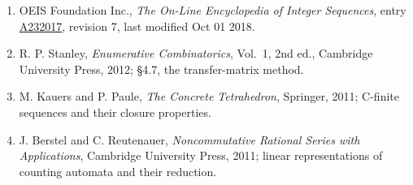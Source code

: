 \documentclass[11pt]{article}
\theoremstyle{definition}
\begin{document}
\begin{enumerate}

\item OEIS Foundation Inc., \emph{The On-Line Encyclopedia of Integer Sequences}, entry \href{https://oeis.org/A232017}{A232017}, revision 7, last modified Oct 01 2018.

\item R. P. Stanley, \emph{Enumerative Combinatorics}, Vol.~1, 2nd ed., Cambridge University Press, 2012; \S4.7, the transfer-matrix method.

\item M. Kauers and P. Paule, \emph{The Concrete Tetrahedron}, Springer, 2011; C-finite sequences and their closure properties.

\item J. Berstel and C. Reutenauer, \emph{Noncommutative Rational Series with Applications}, Cambridge University Press, 2011; linear representations of counting automata and their reduction.

\end{enumerate}
\end{document}
